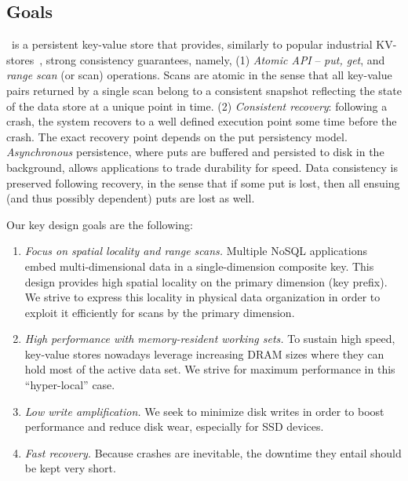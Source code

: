 \subsection{Goals}
\sys\ is a persistent key-value store that provides, similarly to popular industrial KV-stores~\cite{hbase,leveldb,RocksDB}, 
strong consistency guarantees, namely,
(1) \emph{Atomic API} -- \emph{put, get}, and \emph{range scan} (or scan) operations. 
Scans are atomic in the sense that all key-value pairs returned by a single scan belong to a consistent 
snapshot reflecting the state of the data store at a unique point in time.
(2) \emph{Consistent recovery}: following a crash, the system recovers to a well defined execution 
point some time before the crash. The exact recovery point depends on the put persistency model.
\emph{Asynchronous} persistence, where puts are buffered and persisted to disk in the background, allows 
applications to trade durability for speed. Data consistency is preserved following recovery, 
in the sense that if some put is lost, then all ensuing (and thus possibly dependent) puts are lost as well.

Our key design goals are the following:
\begin{enumerate}\itemsep0pt
\item \emph{Focus on spatial locality and range scans.}
 Multiple NoSQL applications embed multi-dimensional data in a single-dimension composite key. 
 This design provides high spatial locality on the primary dimension (key prefix). We strive
 to express this locality in physical data organization in order to exploit it efficiently for scans
 by the primary dimension. 
 
\item \emph{High performance  with memory-resident working sets.}
To sustain high speed, key-value stores nowadays leverage increasing DRAM sizes 
where they can hold most of the active data set. We strive for maximum performance 
in this ``hyper-local'' case.

\item \emph{Low write amplification.} We seek to minimize disk writes in order to boost performance 
and reduce disk wear, especially for SSD devices. 

\item \emph{Fast recovery.}  Because crashes are inevitable, 
the downtime they entail should be kept very short. 
\end{enumerate}

